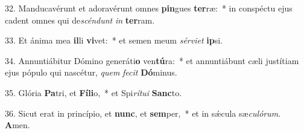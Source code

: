32. Manducavérunt et adoravérunt omnes \textbf{pin}gues \textbf{ter}ræ:~*  in conspéctu ejus cadent omnes qui de\textit{scén}\textit{dunt} \textit{in} \textbf{ter}ram.\

33. Et ánima mea \textbf{il}li \textbf{vi}vet:~*  et semen meum \textit{sér}\textit{vi}\textit{et} \textbf{ip}si.\

34. Annuntiábitur Dómino generáti\textbf{o} ven\textbf{tú}ra:~*  et annuntiábunt cæli justítiam ejus pópulo qui nascétur, \textit{quem} \textit{fe}\textit{cit} \textbf{Dó}minus.\

35. Glória \textbf{Pa}tri, et \textbf{Fí}\textbf{li}o,~*  et Spi\textit{rí}\textit{tu}\textit{i} \textbf{Sanc}to.\

36. Sicut erat in princípio, et \textbf{nunc}, et \textbf{sem}per,~*  et in sǽcula sæ\textit{cu}\textit{ló}\textit{rum}. \textbf{A}men.\

